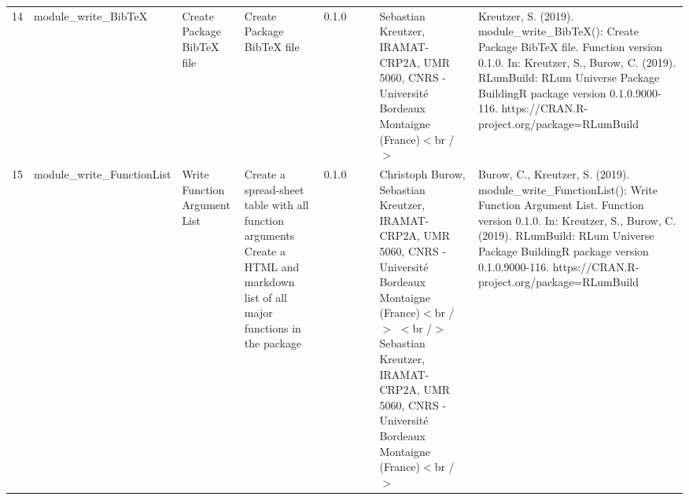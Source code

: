 \begin{table}[ht]
\begin{tabular}{rllllllll}
 \\ 
  14 & module\_write\_BibTeX & Create Package BibTeX file & Create Package BibTeX file & 0.1.0
 &  &  & Sebastian Kreutzer, IRAMAT-CRP2A, UMR 5060, CNRS - Université Bordeaux Montaigne (France)$<$br /$>$ & Kreutzer, S. (2019). module\_write\_BibTeX(): Create Package BibTeX file. Function version 0.1.0. In: Kreutzer, S., Burow, C. (2019). RLumBuild: RLum Universe Package BuildingR package version 0.1.0.9000-116. https://CRAN.R-project.org/package=RLumBuild
 \\ 
  15 & module\_write\_FunctionList & Write Function Argument List & Create a spread-sheet table with all function arguments  Create a HTML and markdown list of all major functions in the package & 0.1.0
 &  &  & Christoph Burow, Sebastian Kreutzer, IRAMAT-CRP2A, UMR 5060, CNRS - Université Bordeaux Montaigne (France)$<$br /$>$ $<$br /$>$ Sebastian Kreutzer, IRAMAT-CRP2A, UMR 5060, CNRS - Université Bordeaux Montaigne (France)$<$br /$>$ & Burow, C., Kreutzer, S. (2019). module\_write\_FunctionList(): Write Function Argument List. Function version 0.1.0. In: Kreutzer, S., Burow, C. (2019). RLumBuild: RLum Universe Package BuildingR package version 0.1.0.9000-116. https://CRAN.R-project.org/package=RLumBuild
 \\ 
   \hline
\end{tabular}
\end{table}

